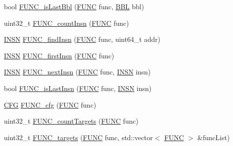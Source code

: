 \begin{DoxyCompactItemize}
\item 
bool \hyperlink{namespace_e_p_a_x_a71eb98e3e6cf284cfe8f03a7d0801f7c}{\-F\-U\-N\-C\-\_\-is\-Last\-Bbl} (\hyperlink{namespace_e_p_a_x_a5b05cc89d633ec2241cb3af828c03024}{\-F\-U\-N\-C} func, \hyperlink{namespace_e_p_a_x_a0ad4f6573b03fa5c375bed0e68d4fab0}{\-B\-B\-L} bbl)
\item 
uint32\-\_\-t \hyperlink{namespace_e_p_a_x_addb0add86b6e8ad05daf12e17d697c4a}{\-F\-U\-N\-C\-\_\-count\-Insn} (\hyperlink{namespace_e_p_a_x_a5b05cc89d633ec2241cb3af828c03024}{\-F\-U\-N\-C} func)
\item 
\hyperlink{namespace_e_p_a_x_a601da5f2ead9a877d566da6cfc9026eb}{\-I\-N\-S\-N} \hyperlink{namespace_e_p_a_x_a327e3b3f02444f7c66dab479b7620354}{\-F\-U\-N\-C\-\_\-find\-Insn} (\hyperlink{namespace_e_p_a_x_a5b05cc89d633ec2241cb3af828c03024}{\-F\-U\-N\-C} func, uint64\-\_\-t addr)
\item 
\hyperlink{namespace_e_p_a_x_a601da5f2ead9a877d566da6cfc9026eb}{\-I\-N\-S\-N} \hyperlink{namespace_e_p_a_x_a3dd9ce87396bb246839d0ec21c9f5b21}{\-F\-U\-N\-C\-\_\-first\-Insn} (\hyperlink{namespace_e_p_a_x_a5b05cc89d633ec2241cb3af828c03024}{\-F\-U\-N\-C} func)
\item 
\hyperlink{namespace_e_p_a_x_a601da5f2ead9a877d566da6cfc9026eb}{\-I\-N\-S\-N} \hyperlink{namespace_e_p_a_x_a145f1ce40606d3b366f8b4705c2026a2}{\-F\-U\-N\-C\-\_\-next\-Insn} (\hyperlink{namespace_e_p_a_x_a5b05cc89d633ec2241cb3af828c03024}{\-F\-U\-N\-C} func, \hyperlink{namespace_e_p_a_x_a601da5f2ead9a877d566da6cfc9026eb}{\-I\-N\-S\-N} insn)
\item 
bool \hyperlink{namespace_e_p_a_x_af0c27ad1ac87e63188bc038a0b414158}{\-F\-U\-N\-C\-\_\-is\-Last\-Insn} (\hyperlink{namespace_e_p_a_x_a5b05cc89d633ec2241cb3af828c03024}{\-F\-U\-N\-C} func, \hyperlink{namespace_e_p_a_x_a601da5f2ead9a877d566da6cfc9026eb}{\-I\-N\-S\-N} insn)
\item 
\hyperlink{namespace_e_p_a_x_a6edfef502c4f06240ec12097855e17dd}{\-C\-F\-G} \hyperlink{namespace_e_p_a_x_a596ee3e43b9dd3619accda65c795196f}{\-F\-U\-N\-C\-\_\-cfg} (\hyperlink{namespace_e_p_a_x_a5b05cc89d633ec2241cb3af828c03024}{\-F\-U\-N\-C} func)
\item 
uint32\-\_\-t \hyperlink{namespace_e_p_a_x_a720c03d407153acf3d865472a8b02c67}{\-F\-U\-N\-C\-\_\-count\-Targets} (\hyperlink{namespace_e_p_a_x_a5b05cc89d633ec2241cb3af828c03024}{\-F\-U\-N\-C} func)
\item 
uint32\-\_\-t \hyperlink{namespace_e_p_a_x_a885d02ec5f424dba1843a0fe9151b259}{\-F\-U\-N\-C\-\_\-targets} (\hyperlink{namespace_e_p_a_x_a5b05cc89d633ec2241cb3af828c03024}{\-F\-U\-N\-C} func, std\-::vector$<$ \hyperlink{namespace_e_p_a_x_a5b05cc89d633ec2241cb3af828c03024}{\-F\-U\-N\-C} $>$ \&func\-List)

\end{DoxyCompactItemize}
